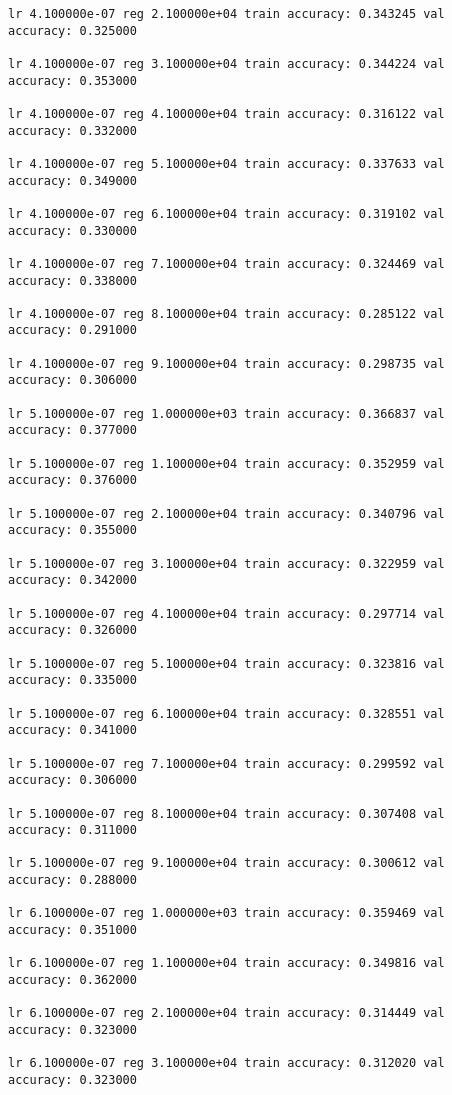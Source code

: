 \documentclass[11pt]{article}
\begin{document}
\begin{Verbatim}[commandchars=\\\{\}]
lr 4.100000e-07 reg 2.100000e+04 train accuracy: 0.343245 val accuracy: 0.325000

lr 4.100000e-07 reg 3.100000e+04 train accuracy: 0.344224 val accuracy: 0.353000

lr 4.100000e-07 reg 4.100000e+04 train accuracy: 0.316122 val accuracy: 0.332000

lr 4.100000e-07 reg 5.100000e+04 train accuracy: 0.337633 val accuracy: 0.349000

lr 4.100000e-07 reg 6.100000e+04 train accuracy: 0.319102 val accuracy: 0.330000

lr 4.100000e-07 reg 7.100000e+04 train accuracy: 0.324469 val accuracy: 0.338000

lr 4.100000e-07 reg 8.100000e+04 train accuracy: 0.285122 val accuracy: 0.291000

lr 4.100000e-07 reg 9.100000e+04 train accuracy: 0.298735 val accuracy: 0.306000

lr 5.100000e-07 reg 1.000000e+03 train accuracy: 0.366837 val accuracy: 0.377000

lr 5.100000e-07 reg 1.100000e+04 train accuracy: 0.352959 val accuracy: 0.376000

lr 5.100000e-07 reg 2.100000e+04 train accuracy: 0.340796 val accuracy: 0.355000

lr 5.100000e-07 reg 3.100000e+04 train accuracy: 0.322959 val accuracy: 0.342000

lr 5.100000e-07 reg 4.100000e+04 train accuracy: 0.297714 val accuracy: 0.326000

lr 5.100000e-07 reg 5.100000e+04 train accuracy: 0.323816 val accuracy: 0.335000

lr 5.100000e-07 reg 6.100000e+04 train accuracy: 0.328551 val accuracy: 0.341000

lr 5.100000e-07 reg 7.100000e+04 train accuracy: 0.299592 val accuracy: 0.306000

lr 5.100000e-07 reg 8.100000e+04 train accuracy: 0.307408 val accuracy: 0.311000

lr 5.100000e-07 reg 9.100000e+04 train accuracy: 0.300612 val accuracy: 0.288000

lr 6.100000e-07 reg 1.000000e+03 train accuracy: 0.359469 val accuracy: 0.351000

lr 6.100000e-07 reg 1.100000e+04 train accuracy: 0.349816 val accuracy: 0.362000

lr 6.100000e-07 reg 2.100000e+04 train accuracy: 0.314449 val accuracy: 0.323000

lr 6.100000e-07 reg 3.100000e+04 train accuracy: 0.312020 val accuracy: 0.323000


\end{Verbatim}
\end{document}
